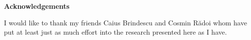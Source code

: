 \begin{alwayssingle} 
\pagestyle{empty}
\begin{center}
\vspace*{1.5cm}
{\Large \bfseries Acknowledgements}
\end{center}
\vspace{0.5cm}

I would like to thank my friends Caius Brindescu and Cosmin R\u{a}doi whom have
put at least just as much effort into the research presented here as I have.
% 

\end{alwayssingle} 
